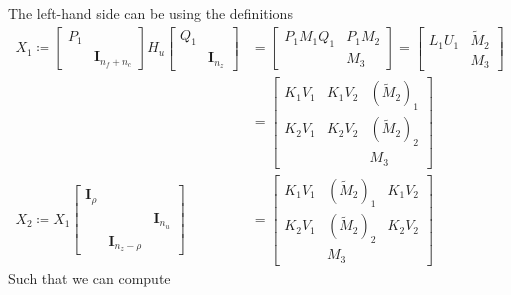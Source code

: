 \documentclass{article}
\begin{document}
The left-hand side can be using the definitions
\begin{align}
    X_1 \coloneqq \begin{bmatrix} P_1 & \\ & \bm{I}_{n_f + n_c} \end{bmatrix}
    H_u
    \begin{bmatrix} Q_1 & \\ & \bm{I}_{n_z}\end{bmatrix}
    &= \begin{bmatrix} P_1 M_1 Q_1 & P_1 M_2 \\ & M_3 \end{bmatrix}
     = \begin{bmatrix} L_1 U_1 & \tilde{M}_2 \\ & M_3 \end{bmatrix}\\
    &= \begin{bmatrix} K_1 V_1 & K_1 V_2 & (\tilde{M}_2)_1 \\ K_2 V_1 & K_2 V_2 & (\tilde{M}_2)_2 \\ & & M_3 \end{bmatrix}\\
    X_2 \coloneqq X_1 \begin{bmatrix} \bm{I}_\rho & & \\ & & \bm{I}_{n_u} \\ & \bm{I}_{n_z-\rho} & \end{bmatrix}
    &= \begin{bmatrix} K_1 V_1 & (\tilde{M}_2)_1 & K_1 V_2 \\ K_2 V_1 & (\tilde{M}_2)_2 & K_2 V_2 \\ & M_3 & \end{bmatrix}
\end{align}
Such that we can compute
\end{document}
